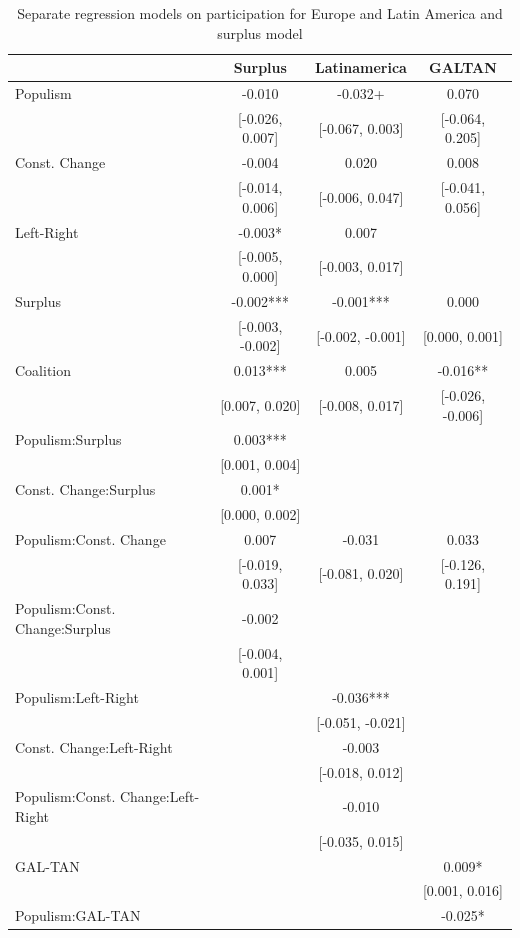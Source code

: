 \documentclass[
  abstract]{article}
\begin{document}
\hypertarget{tbl-partip_sep}{}
\begin{table}
\caption{\label{tbl-partip_sep}Separate regression models on participation for Europe and Latin America
and surplus model }\tabularnewline

\centering\centering\centering
\begin{tabular}[t]{lccc}
\toprule
  & Surplus & Latinamerica & GALTAN\\
\midrule
Populism & -0.010 & -0.032+ & 0.070\\
 & {}[-0.026, 0.007] & {}[-0.067, 0.003] & {}[-0.064, 0.205]\\
Const. Change & -0.004 & 0.020 & 0.008\\
 & {}[-0.014, 0.006] & {}[-0.006, 0.047] & {}[-0.041, 0.056]\\
Left-Right & -0.003* & 0.007 & \\
 & {}[-0.005, 0.000] & {}[-0.003, 0.017] & \\
Surplus & -0.002*** & -0.001*** & 0.000\\
 & {}[-0.003, -0.002] & {}[-0.002, -0.001] & {}[0.000, 0.001]\\
Coalition & 0.013*** & 0.005 & -0.016**\\
 & {}[0.007, 0.020] & {}[-0.008, 0.017] & {}[-0.026, -0.006]\\
Populism:Surplus & 0.003*** &  & \\
 & {}[0.001, 0.004] &  & \\
Const. Change:Surplus & 0.001* &  & \\
 & {}[0.000, 0.002] &  & \\
Populism:Const. Change & 0.007 & -0.031 & 0.033\\
 & {}[-0.019, 0.033] & {}[-0.081, 0.020] & {}[-0.126, 0.191]\\
Populism:Const. Change:Surplus & -0.002 &  & \\
 & {}[-0.004, 0.001] &  & \\
Populism:Left-Right &  & -0.036*** & \\
 &  & {}[-0.051, -0.021] & \\
Const. Change:Left-Right &  & -0.003 & \\
 &  & {}[-0.018, 0.012] & \\
Populism:Const. Change:Left-Right &  & -0.010 & \\
 &  & {}[-0.035, 0.015] & \\
GAL-TAN &  &  & 0.009*\\
 &  &  & {}[0.001, 0.016]\\
Populism:GAL-TAN &  &  & -0.025*\\

\end{tabular}
\end{table}
\end{document}
